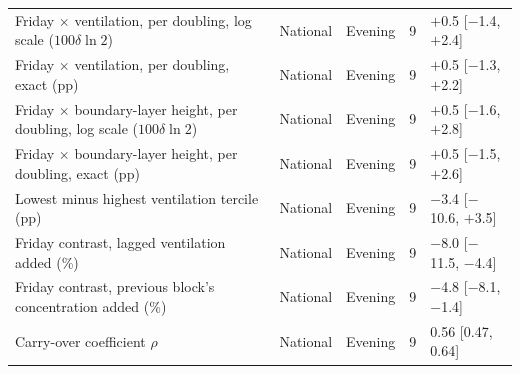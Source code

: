 \begin{longtable}{L{7.0cm} L{1.4cm} L{1.6cm} C{0.6cm} C{3.2cm}}
Friday $\times$ ventilation, per doubling, log scale ($100\delta\ln 2$) & National & Evening & 9 & $+$0.5 {\scriptsize[$-$1.4, $+$2.4]} \\
Friday $\times$ ventilation, per doubling, exact (pp) & National & Evening & 9 & $+$0.5 {\scriptsize[$-$1.3, $+$2.2]} \\
Friday $\times$ boundary-layer height, per doubling, log scale ($100\delta\ln 2$) & National & Evening & 9 & $+$0.5 {\scriptsize[$-$1.6, $+$2.8]} \\
Friday $\times$ boundary-layer height, per doubling, exact (pp) & National & Evening & 9 & $+$0.5 {\scriptsize[$-$1.5, $+$2.6]} \\
Lowest minus highest ventilation tercile (pp) & National & Evening & 9 & $-$3.4 {\scriptsize[$-$10.6, $+$3.5]} \\
Friday contrast, lagged ventilation added (\%) & National & Evening & 9 & $-$8.0 {\scriptsize[$-$11.5, $-$4.4]} \\
Friday contrast, previous block's concentration added (\%) & National & Evening & 9 & $-$4.8 {\scriptsize[$-$8.1, $-$1.4]} \\
Carry-over coefficient $\rho$ & National & Evening & 9 & 0.56 {\scriptsize[0.47, 0.64]} \\
\end{longtable}
\endgroup
